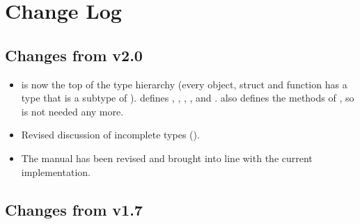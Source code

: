 \documentclass[12pt,twoside,notitlepage]{report}
\begin{document}


 

\clearpage

{\parskip 0pt
\addtolength{\cftsecnumwidth}{0.5em}
\addtolength{\cftsubsecnumwidth}{0.5em}
\addtolength{\cftsubsecindent}{0.5em}
\tableofcontents
}




	






	
	
	
	
	
	



%
\renewcommand{\bibname}{References}



%	


\clearpage


\appendix

\chapter{Change Log}

\section{Changes from \Xten{} v2.0}

\begin{itemize}
\item {} is now the top of the type hierarchy (every object,
  struct and function has a type that is a subtype of
  ).  defines , , ,
  ,  and .  also defines the methods
  of , so  is not needed any more.
\item Revised discussion of incomplete types ().
\item The manual has been revised and brought into line with the current implementation. 
\end{itemize}
\section{Changes from \Xten{} v1.7}
\end{document}

